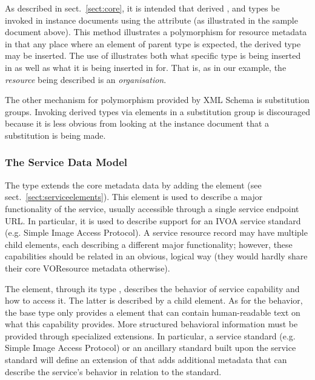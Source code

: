 \documentclass[11pt,a4paper]{ivoa}
\begin{document}
As described in sect.~\ref{sect:core}, it is intended that derived
,  and 
types be invoked in instance documents using the 
attribute (as illustrated in the sample document above).  This method
illustrates a polymorphism for resource metadata in that any place where
an element of parent type is expected, the derived type may be inserted.
The use of  illustrates both what specific type is being
inserted in as well as what it is being inserted in for.  That is, as in
our example, the \emph{resource} being described is an
\emph{organisation}.



The other mechanism for polymorphism provided by XML Schema is
substitution groups.  Invoking derived  types via
elements in a substitution group is discouraged because it is less
obvious from looking at the instance document that a substitution is
being made.


\subsubsection{The Service Data Model}
\label{sect:servicemodel}


The  type extends the core 
metadata data by adding the  element (see
sect.~\ref{sect:serviceelements}).  This element is used to describe a major
functionality of the service, usually accessible through a single
service endpoint URL.  In particular, it is used to describe support for
an IVOA service standard (e.g. Simple Image Access Protocol).  A service
resource record may have multiple child  elements,
each describing a different major functionality; however, these
capabilities should be related in an obvious, logical way (they would
hardly share their core VOResource metadata otherwise).

The  element, through its type ,
describes the behavior of service capability and how to access it.  The
latter is described by a child  element.  As for the
behavior, the base  type only provides a
 element that can contain human-readable text on what
this capability provides.  More structured behavioral information must
be provided through specialized  extensions.  In
particular, a service standard (e.g. Simple Image
Access Protocol) or an ancillary standard built upon the service
standard will define an extension of  that
adds additional metadata that can describe the service's behavior in
relation to the standard.
\end{document}
